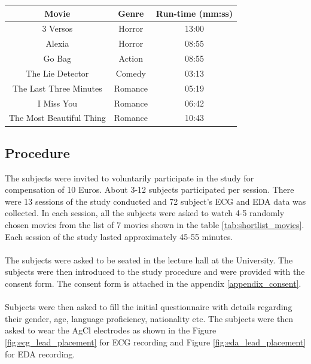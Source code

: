 \begin{center}
\begin{tabular}{ |c|c|c| }
\hline
Movie & Genre & Run-time (mm:ss) \\
\hline
\hline
3 Versos & Horror & 13:00 \\
\hline
Alexia & Horror & 08:55 \\
\hline
Go Bag & Action & 08:55 \\
\hline
The Lie Detector & Comedy & 03:13 \\
\hline
The Last Three Minutes & Romance & 05:19 \\
\hline
I Miss You & Romance & 06:42 \\
\hline
The Most Beautiful Thing & Romance & 10:43 \\
\hline
\end{tabular}
\label{tab:shortlist_movies}
\end{center}

\subsection{Procedure}
\label{sec:procedure}
The subjects were invited to voluntarily participate in the study for compensation of 10 Euros. About 3-12 subjects participated per session. There were 13 sessions of the study conducted and 72 subject's ECG and EDA data was collected. In each session, all the subjects were asked to watch 4-5 randomly chosen movies from the list of 7 movies shown in the table \ref{tab:shortlist_movies}. Each session of the study lasted approximately 45-55 minutes.
\paragraph{}
The subjects were asked to be seated in the lecture hall at the University. The subjects were then introduced to the study procedure and were provided with the consent form. The consent form is attached in the appendix \ref{appendix_consent}.
\paragraph{}
Subjects were then asked to fill the initial questionnaire with details regarding their gender, age, language proficiency, nationality etc. The subjects were then asked to wear the AgCl electrodes as shown in the Figure \ref{fig:ecg_lead_placement} for ECG recording and Figure \ref{fig:eda_lead_placement} for EDA recording.
